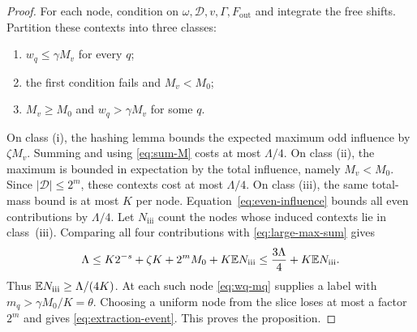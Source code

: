 \begin{proof}
For each node, condition on $\omega,\mathcal D,v,\Gamma,F_{\mathrm{out}}$
and integrate the free shifts. Partition these contexts into three classes:
\begin{enumerate}[label=(\roman*)]
\item $w_q\le\gamma M_v$ for every $q$;
\item the first condition fails and $M_v<M_0$;
\item $M_v\ge M_0$ and $w_q>\gamma M_v$ for some $q$.
\end{enumerate}
On class (i), the hashing lemma bounds the expected maximum odd influence
by $\zeta M_v$. Summing and using \eqref{eq:sum-M} costs at most
$\Lambda/4$. On class (ii), the maximum is bounded in expectation by the
total influence, namely $M_v<M_0$. Since $|\mathcal D|\le2^m$, these
contexts cost at most $\Lambda/4$. On class (iii), the same total-mass
bound is at most $K$ per node.
Equation~\eqref{eq:even-influence} bounds all even contributions by
$\Lambda/4$. Let $N_{\mathrm{iii}}$ count the nodes whose induced
contexts lie in class~(iii). Comparing all four contributions with
\eqref{eq:large-max-sum} gives
\[
 \Lambda
 \le K2^{-s}+\zeta K+2^m M_0+K\mathbb E N_{\mathrm{iii}}
 \le\frac{3\Lambda}{4}+K\mathbb E N_{\mathrm{iii}}.
\]
Thus $\mathbb E N_{\mathrm{iii}}\ge\Lambda/(4K)$.
At each such node \eqref{eq:wq-mq} supplies a label with
$m_q>\gamma M_0/K=\theta$.
Choosing a uniform node from the slice loses at most a factor $2^m$ and
gives \eqref{eq:extraction-event}. This proves the proposition.
\end{proof}
